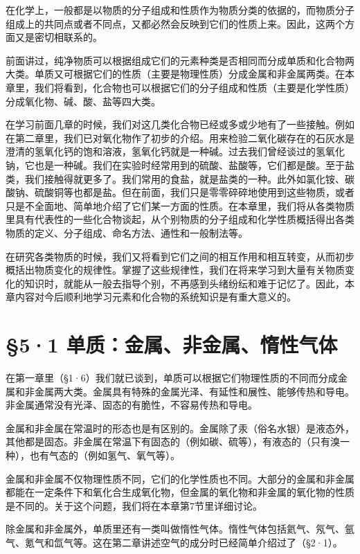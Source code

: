 在化学上，一般都是以物质的分子组成和性质作为物质分类的依据的，而物质分子组成上的共同点或者不同点，又都必然会反映到它们的性质上来。因此，这两个方面又是密切相联系的。

前面讲过，纯净物质可以根据组成它们的元素种类是否相同而分成单质和化合物两大类。单质又可根据它们的性质（主要是物理性质）分成金属和非金属两类。在本章里，我们将看到，化合物也可以根据它们的分子组成和性质（主要是化学性质）分成氧化物、碱、酸、盐等四大类。

在学习前面几章的时候，我们对这几类化合物已经或多或少地有了一些接触。例如在第二章里，我们已对氧化物作了初步的介绍。用来检验二氧化碳存在的石灰水是澄清的氢氧化钙的饱和溶液，氢氧化钙就是一种碱。过去我们曾经谈过的氢氧化钠，它也是一种碱。我们在实验时经常用到的硫酸、盐酸等，它们都是酸。至于盐类，我们接触得就更多了。我们常用的食盐，就是盐类的一种。此外如氯化铵、碳酸钠、硫酸铜等也都是盐。但在前面，我们只是零零碎碎地使用到这些物质，或者只是不全面地、简单地介绍了它们某一方面的性质。在本章里，我们将从各类物质里具有代表性的一些化合物谈起，从个别物质的分子组成和化学性质概括得出各类物质的定义、分子组成、命名方法、通性和一般制法等。

在研究各类物质的时候，我们又将看到它们之间的相互作用和相互转变，从而初步概括出物质变化的规律性。掌握了这些规律性，我们在将来学习到大量有关物质变化的知识时，就能从一般去指导个别，不再感到头绪纷纭和难于记忆了。因此，本章内容对今后顺利地学习元素和化合物的系统知识是有重大意义的。

\section{§5·1 单质：金属、非金属、惰性气体}

在第一章里（§1·6）我们就已谈到，单质可以根据它们物理性质的不同而分成金属和非金属两大类。金属具有特殊的金属光泽、有延性和展性、能够传热和导电。非金属通常没有光泽、固态的有脆性，不容易传热和导电。

金属和非金属在常温时的形态也是有区别的。金属除了汞（俗名水银）是液态外，其他都是固态。非金属在常温下有固态的（例如碳、硫等），有液态的（只有溴一种），也有气态的（例如氢气、氧气等）。

金属和非金属不仅物理性质不同，它们的化学性质也不同。大部分的金属和非金属都能在一定条件下和氧化合生成氧化物，但金属的氧化物和非金属的氧化物的性质是不同的。关于这个问题，我们将在本章第7节里详细讨论。

除金属和非金属外，单质里还有一类叫做惰性气体。惰性气体包括氦气、氖气、氩气、氪气和氙气等。这在第二章讲述空气的成分时已经简单介绍过了（§2·1）。

